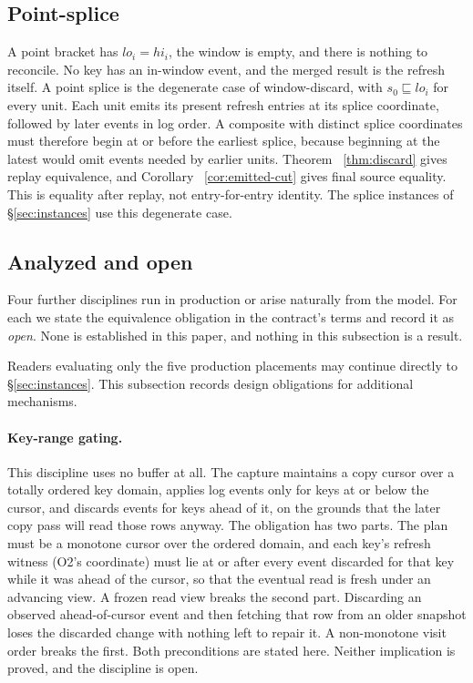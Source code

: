\documentclass[sigconf,nonacm,10pt]{acmart}
\theoremstyle{plain}
\theoremstyle{definition}
\newcommand{\pre}{\sqsubseteq}                   %
\begin{document}
\subsection{Point-splice}\label{sec:merge-point}

A point bracket has $lo_i = hi_i$, the window is empty, and there
is nothing to reconcile. No key has an in-window event, and the merged
result is the refresh itself. A point splice is the degenerate case of
window-discard, with $s_0 \pre lo_i$ for every unit. Each unit emits its
present refresh entries at its splice coordinate, followed by later
events in log order. A composite with distinct splice coordinates must
therefore begin at or before the earliest splice, because beginning at the
latest would omit events needed by earlier units. Theorem
~\ref{thm:discard} gives replay equivalence, and Corollary
~\ref{cor:emitted-cut} gives final source equality. This is equality
after replay, not entry-for-entry identity. The splice instances of
\S\ref{sec:instances} use this degenerate case.

\subsection{Analyzed and open}\label{sec:merge-open}

Four further disciplines run in production or arise naturally from
the model. For each we state the equivalence obligation in the
contract's terms and record it as \emph{open}. None is established
in this paper, and nothing in this subsection is a result.

Readers evaluating only the five production placements may continue
directly to \S\ref{sec:instances}. This subsection records design
obligations for additional mechanisms.

\paragraph{Key-range gating.}
This discipline uses no buffer at all. The capture maintains a copy cursor over a
totally ordered key domain, applies log events only for keys at or
below the cursor, and discards events for keys ahead of it, on the
grounds that the later copy pass will read those rows anyway. The
obligation has two parts. The plan must be a monotone cursor over
the ordered domain, and each key's refresh witness (O2's
coordinate) must lie at or after every event discarded for that
key while it was ahead of the cursor, so that the eventual read is
fresh under an advancing view. A frozen read view breaks the
second part. Discarding an observed ahead-of-cursor event and then fetching
that row from an older snapshot loses the discarded
change with nothing left to repair it. A non-monotone
visit order breaks the first. Both preconditions are stated here.
Neither implication is proved, and the discipline is open.
\end{document}
